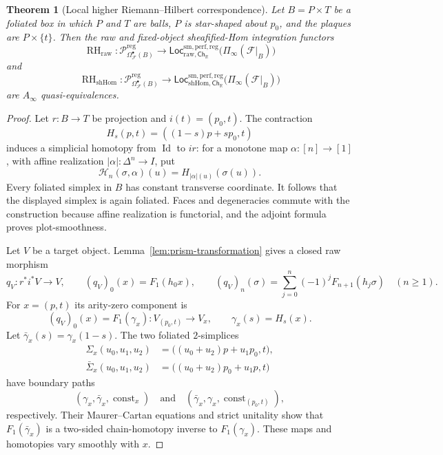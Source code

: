 \documentclass[12pt]{amsart}
\newtheorem{thm}{Theorem}[section]
\theoremstyle{definition}
\theoremstyle{remark}
\numberwithin{equation}{section}
\newcommand{\CF}{{\mathcal F}}
\newcommand{\R}{{\mathbb{R}}}
\newcommand{\1}{{\mathbb{1}}}
\newcommand{\Ch}{\mathsf{Ch}}
\newcommand{\Loc}{\mathsf{Loc}}
\newcommand{\RH}{\operatorname{RH}}
\newcommand{\id}{\operatorname{Id}}
\begin{document}
\begin{thm}[Local higher Riemann--Hilbert correspondence]
\label{thm:local-rh}
Let $B=P\times T$ be a foliated box in which $P$ and $T$ are balls,
$P$ is star-shaped about $p_0$, and the plaques are
$P\times\{t\}$.  Then the raw and fixed-object sheafified-Hom
integration functors
\[
 \RH_{\mathrm{raw}}:
 \mathcal P_{\Omega^\bullet_{\CF}(B)}^{\mathrm{reg}}
 \longrightarrow
 \Loc_{\mathrm{raw},\Ch_{\R}}^{\mathrm{sm,perf,reg}}
 \bigl(\Pi_\infty(\CF|_B)\bigr)
\]
and
\[
 \RH_{\mathrm{shHom}}:
 \mathcal P_{\Omega^\bullet_{\CF}(B)}^{\mathrm{reg}}
 \longrightarrow
 \Loc_{\mathrm{shHom},\Ch_{\R}}^{\mathrm{sm,perf,reg}}
 \bigl(\Pi_\infty(\CF|_B)\bigr)
\]
are $A_\infty$ quasi-equivalences.
\end{thm}

\begin{proof}
Let $r:B\to T$ be projection and $i(t)=(p_0,t)$.  The contraction
\[
 H_s(p,t)=((1-s)p+sp_0,t)
\]
induces a simplicial homotopy from $\id$ to $ir$: for a monotone map
$\alpha:[n]\to[1]$, with affine realization
$|\alpha|:\Delta^n\to I$, put
\[
 \mathcal H_n(\sigma,\alpha)(u)
 =
 H_{|\alpha|(u)}(\sigma(u)).
\]
Every foliated simplex in $B$ has constant transverse coordinate.
It follows that the displayed simplex is again foliated.  Faces and
degeneracies commute with the construction because affine realization
is functorial, and the adjoint formula proves plot-smoothness.

Let $V$ be a target object.  Lemma~\ref{lem:prism-transformation}
gives a closed raw morphism
\begin{equation}\label{eq:local-prism-comparison}
 q_V:r^*i^*V\longrightarrow V,
 \qquad
 (q_V)_0(x)=F_1(h_0x),
 \qquad
 (q_V)_n(\sigma)=
 \sum_{j=0}^n(-1)^jF_{n+1}(h_j\sigma)
 \quad(n\geq1).
\end{equation}
For $x=(p,t)$ its arity-zero component is
\[
 (q_V)_0(x)=F_1(\gamma_x):
 V_{(p_0,t)}\longrightarrow V_x,
 \qquad
 \gamma_x(s)=H_s(x).
\]
Let $\bar\gamma_x(s)=\gamma_x(1-s)$.  The two foliated
$2$-simplices
\begin{align*}
 \Sigma_x(u_0,u_1,u_2)
 &=
 \bigl((u_0+u_2)p+u_1p_0,t\bigr),\\
 \bar\Sigma_x(u_0,u_1,u_2)
 &=
 \bigl((u_0+u_2)p_0+u_1p,t\bigr)
\end{align*}
have boundary paths
\[
 (\gamma_x,\bar\gamma_x,\operatorname{const}_x)
 \quad\text{and}\quad
 (\bar\gamma_x,\gamma_x,\operatorname{const}_{(p_0,t)}),
\]
respectively.  Their Maurer--Cartan equations and strict unitality
show that $F_1(\bar\gamma_x)$ is a two-sided chain-homotopy inverse to
$F_1(\gamma_x)$.  These maps and homotopies vary smoothly with $x$.


\end{proof}
\end{document}
